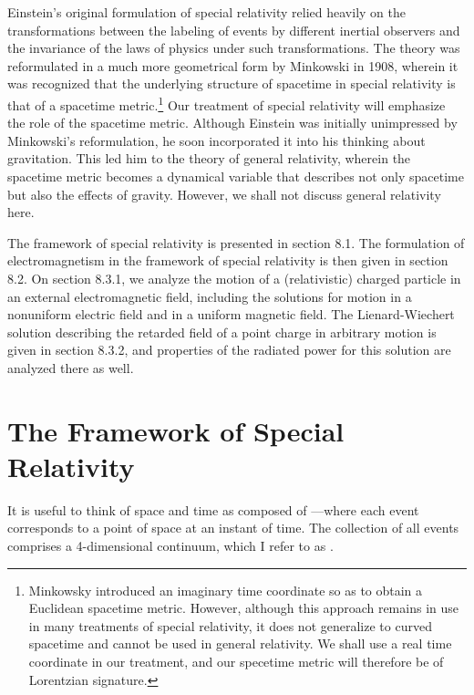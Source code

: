 Einstein's original formulation of special relativity relied heavily on the transformations between the labeling of events by different inertial observers and the invariance of the laws of physics under such transformations. The theory was reformulated in a much more geometrical form by Minkowski in 1908, wherein it was recognized that the underlying structure of spacetime in special relativity is that of a spacetime metric.\footnote{Minkowsky introduced an imaginary time coordinate so as to obtain a Euclidean spacetime metric. However, although this approach remains in use in many treatments of special relativity, it does not generalize to curved spacetime and cannot be used in general relativity. We shall use a real time coordinate in our treatment, and our specetime metric will therefore be of Lorentzian signature.} Our treatment of special relativity will emphasize the role of the spacetime metric. Although Einstein was initially unimpressed by Minkowski's reformulation, he soon incorporated it into his thinking about gravitation. This led him to the theory of general relativity, wherein the spacetime metric becomes a dynamical variable that describes not only spacetime but also the effects of gravity. However, we shall not discuss general relativity here. 

The framework of special relativity is presented in section 8.1. The formulation of electromagnetism in the framework of special relativity is then given in section 8.2. On section 8.3.1, we analyze the motion of a (relativistic) charged particle in an external electromagnetic field, including the solutions for motion in a nonuniform electric field and in a uniform magnetic field. The Lienard-Wiechert solution describing the retarded field of a point charge in arbitrary motion is given in section 8.3.2, and properties of the radiated power for this solution are analyzed there as well.  

\section{The Framework of Special Relativity}\label{sec:8.1}
It is useful to think of space and time as composed of ---where each event corresponds to a point of space at an instant of time. The collection of all events comprises a 4-dimensional continuum, which I refer to as .

